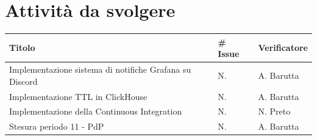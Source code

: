 \documentclass{article}
\begin{document}
    \section{Attività da svolgere}
    \begin{center}
        \begin{tabular}{|C{7cm}|C{1,5cm}|C{3cm}|}
            \hline
            \textbf{Titolo} & \textbf{\# Issue} & \textbf{Verificatore} \\
            \hline
            \hline
            Implementazione sistema di notifiche Grafana su Discord & N. & A. Barutta \\
            \hline
            Implementazione TTL in ClickHouse & N. & A. Barutta \\
            \hline
            Implementazione della Continuous Integration & N. & N. Preto \\
            \hline
            Stesura periodo 11 - PdP & N. & A. Barutta \\
            \hline
        \end{tabular}
    \end{center}
\end{document}
